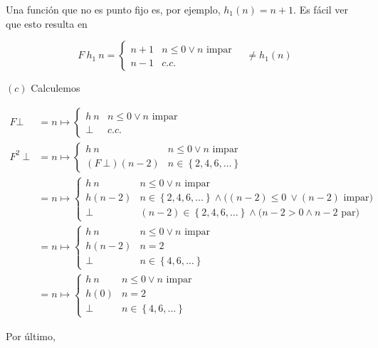 \documentclass[a4paper, 12pt]{article}
\begin{document}
Una función que no es punto fijo es, por ejemplo, $h_1(n) = n + 1$. Es fácil ver
que esto resulta en 

\begin{equation*}
  F ~ h_1 ~ n = \begin{cases}
    n + 1 & n \leq 0 \lor  n \text{ impar} \\ 
    n - 1 & c.c.
  \end{cases} \quad\neq h_1(n)
\end{equation*}

$(c)$ Calculemos 

\begin{align*}
  F \bot 
  &=n \mapsto \begin{cases}
    h ~ n & n \leq 0 \lor  n \text{ impar} \\ 
    \bot & c.c.
  \end{cases}  \\ 
  F^2 ~ \bot 
  &= n \mapsto \begin{cases}
    h ~ n & n \leq 0 \lor  n \text{ impar} \\ 
    (F ~ \bot )(n-2) & n \in \left\{ 2, 4, 6,\ldots \right\} 
  \end{cases} \\ 
  &=n\mapsto \begin{cases}
    h ~ n & n \leq 0 \lor  n \text{ impar} \\ 
    h(n-2) & n \in \left\{ 2, 4, 6,\ldots \right\} \land  \Big(
      (n-2) \leq 0\
      \lor (n-2) \text{ impar} \Big)\\ 
    \bot & (n-2) \in \left\{ 2, 4, 6,\ldots \right\} \land \Big( n -2 > 0 \land
    n -2 \text{ par}\Big)
  \end{cases} \\ 
  &=n\mapsto \begin{cases}
    h ~ n & n \leq 0 \lor  n \text{ impar} \\ 
    h(n-2) & n = 2\\
      \bot  & n \in \left\{ 4, 6, \ldots \right\}   
  \end{cases}\\
  &=n\mapsto \begin{cases}
    h ~ n & n \leq 0 \lor  n \text{ impar} \\ 
    h(0) & n = 2 
    \\ 
      \bot & n \in \left\{ 4, 6, \ldots \right\}
  \end{cases}
\end{align*}

Por último,
\end{document}
